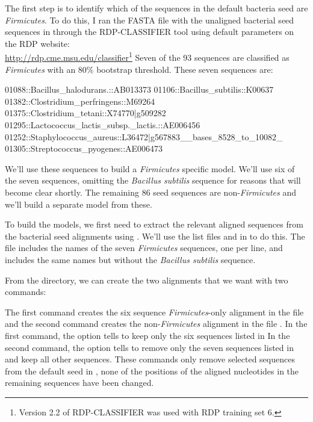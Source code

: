 The first step is to identify which of the sequences in the default
bacteria seed are \emph{Firmicutes}. To do this, I ran the FASTA file
with the unaligned bacterial seed sequences in
 through the RDP-CLASSIFIER tool
using default parameters \cite{Wang07} on the RDP website: \\
\url{http://rdp.cme.msu.edu/classifier}\footnote{Version
  2.2 of RDP-CLASSIFIER was used with RDP training set 6.}
Seven of the 93 sequences are classified as \emph{Firmicutes} with an
80\% bootstrap threshold. These seven sequences are:
\begin{sreoutput}
01088::Bacillus_halodurans.::AB013373
01106::Bacillus_subtilis::K00637
01382::Clostridium_perfringens::M69264
01375::Clostridium_tetani::X74770|g509282
01295::Lactococcus_lactis_subsp._lactis.::AE006456
01252::Staphylococcus_aureus::L36472|g567883__bases_8528_to_10082_
01305::Streptococcus_pyogenes::AE006473
\end{sreoutput}

We'll use these sequences to build a \emph{Firmicutes} specific model. 
We'll use six of the seven sequences, omitting the \emph{Bacillus subtilis}
sequence for reasons that will become clear shortly.
The remaining 86 seed sequences are non-\emph{Firmicutes} and we'll build 
a separate model from these. 

To build the models, we first need to extract the relevant aligned sequences
from the bacterial seed alignments using . We'll use
the list files  and  in
 to do this. The  file
includes the names of the seven \emph{Firmicutes} sequences, one per
line, and  includes the same names but without the
\emph{Bacillus subtilis} sequence. 

From the  directory, we can create the two alignments
that we want with two commands:



The first command creates the six sequence \emph{Firmicutes}-only
alignment in the file \\  and the
second command creates the non-\emph{Firmicutes}
alignment in the file . 
In the first command, the  option tells 
to keep only the six sequences listed in  In the
second command, the  option tells  to
remove only the seven sequences listed in  and keep
all other sequences.  These commands only remove selected sequences
from the default seed in , none of
the positions of the aligned nucleotides in the remaining sequences
have been changed.

